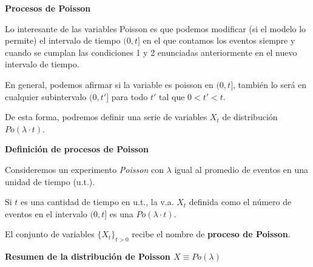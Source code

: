 \documentclass[]{book}
\begin{document}
\textbf{Procesos de Poisson}

Lo interesante de las variables Poisson es que podemos modificar (si el modelo lo permite) el intervalo de tiempo \((0,t]\) en el que contamos los eventos siempre y cuando se cumplan las condiciones 1 y 2 enunciadas anteriormente en el nuevo intervalo de tiempo.

En general, podemos afirmar si la variable es poisson en \((0,t]\), también lo será en cualquier subintervalo \((0,t']\) para todo \(t'\) tal que \(0<t'<t\).

De esta forma, podremos definir una serie de variables \(X_t\) de distribución \(Po(\lambda\cdot t)\).

 \textbf{Definición de procesos de Poisson}

Consideremos un experimento \emph{Poisson} con \(\lambda\) igual
al promedio de eventos en una unidad de tiempo (u.t.).

Si \(t\) es una cantidad de tiempo en u.t., la v.a. \(X_{t}\) definida como el número de eventos en el intervalo \((0,t]\) es una \(Po(\lambda\cdot t)\).

El conjunto de variables \(\{X_t\}_{t>0}\) recibe el nombre de \textbf{proceso de Poisson}.

\textbf{Resumen de la distribución de Poisson \(X\equiv Po(\lambda)\)}
\end{document}
